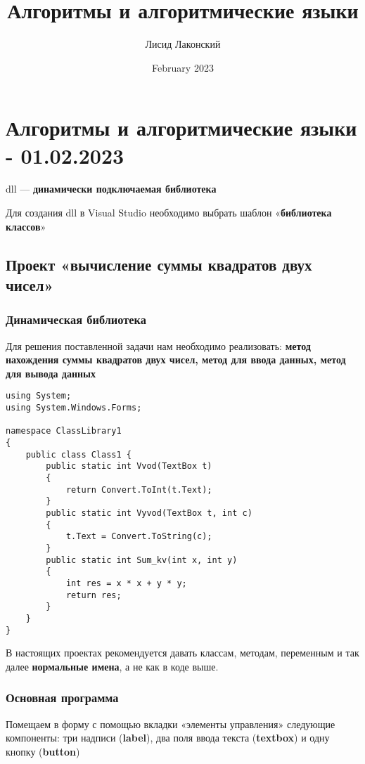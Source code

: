 \documentclass{article}
\title{Алгоритмы и алгоритмические языки}
\author{Лисид Лаконский}
\date{February 2023}
\begin{document}
\raggedright

\maketitle
\tableofcontents
\pagebreak

\section{Алгоритмы и алгоритмические языки - 01.02.2023}

dll — \textbf{динамически подключаемая библиотека}

Для создания dll в Visual Studio необходимо выбрать шаблон «\textbf{библиотека классов}»

\subsection{Проект «вычисление суммы квадратов двух чисел»}

\subsubsection{Динамическая библиотека}

Для решения поставленной задачи нам необходимо реализовать: \textbf{метод нахождения суммы квадратов двух чисел, метод для ввода данных, метод для вывода данных}

\begin{verbatim}
using System;
using System.Windows.Forms;

namespace ClassLibrary1
{
    public class Class1 {
        public static int Vvod(TextBox t)
        {
            return Convert.ToInt(t.Text);
        }
        public static int Vyvod(TextBox t, int c)
        {
            t.Text = Convert.ToString(c);
        }
        public static int Sum_kv(int x, int y)
        {
            int res = x * x + y * y;
            return res;
        }
    }
}
\end{verbatim}

В настоящих проектах рекомендуется давать классам, методам, переменным и так далее \textbf{нормальные имена}, а не как в коде выше.

\subsubsection{Основная программа}

Помещаем в форму с помощью вкладки «элементы управления» следующие компоненты: три надписи (\textbf{label}), два поля ввода текста (\textbf{textbox}) и одну кнопку (\textbf{button})
\end{document}
